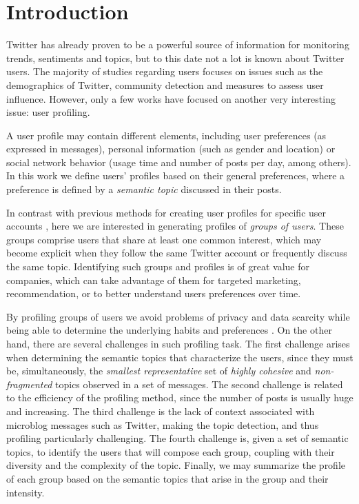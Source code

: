 \section{Introduction}

Twitter has already proven to be a powerful source of information for  monitoring
trends, sentiments and topics, 
but to
this date not a lot is known about Twitter users.  The majority of studies
regarding users focuses on issues such as the demographics of Twitter, 
community detection %
and measures to assess user influence.  However, only a 
few works have focused on another very interesting issue: user profiling\cite{abel:2011}. 

A user profile may contain different elements, including user preferences (as
expressed in messages), personal information (such as gender and location) or
social network behavior (usage time and number of posts per day, among others).
In this work we define users' profiles based on their general preferences,
where a preference is defined by a \textit{semantic topic} discussed in their
posts. 
 
In contrast with previous methods for creating user profiles for specific user
accounts \cite{pennacchiotti2011democrats,abel2011semantic}, here we are
interested in generating profiles of \textit{groups of users}.  These groups
comprise users that share at least one common interest, which may become
explicit when they follow the same Twitter account or frequently discuss the
same topic. Identifying such groups and profiles is of great value for
companies, which can take advantage of them for targeted marketing,
recommendation, or to better understand users preferences over time. 

By profiling groups of users we avoid problems of privacy and data scarcity
while being able to determine the underlying habits and preferences
\cite{zheleva:2009}.  On the other hand, there are several challenges in
such profiling task. The first challenge arises when determining the
semantic topics that characterize the users, since they must be,
simultaneously, the \textit{smallest representative} set of \textit{highly
cohesive} and \textit{non-fragmented} topics observed in a set of messages.
The second challenge is related to the efficiency of the profiling method,
since the number of posts is usually huge and increasing. The third challenge
is the lack of context associated with microblog messages such as Twitter,
making the topic detection, and thus profiling particularly challenging.
The fourth challenge is, given a set of semantic topics, to identify the 
users that will compose each group, coupling with their diversity
and the complexity of the topic. Finally, we may summarize the profile of
each group based on the semantic topics that arise in the group and 
their intensity.


